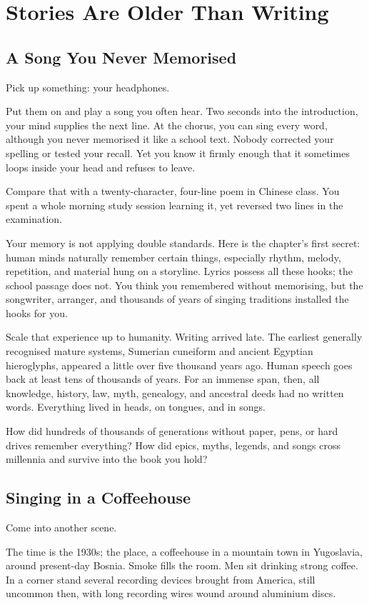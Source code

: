 \chapter{Stories Are Older Than Writing}
\section{A Song You Never Memorised}
Pick up something: your headphones.

Put them on and play a song you often hear. Two seconds into the introduction, your mind supplies the next line. At the chorus, you can sing every word, although you never memorised it like a school text. Nobody corrected your spelling or tested your recall. Yet you know it firmly enough that it sometimes loops inside your head and refuses to leave.

Compare that with a twenty-character, four-line poem in Chinese class. You spent a whole morning study session learning it, yet reversed two lines in the examination.

Your memory is not applying double standards. Here is the chapter's first secret: human minds naturally remember certain things, especially rhythm, melody, repetition, and material hung on a storyline. Lyrics possess all these hooks; the school passage does not. You think you remembered without memorising, but the songwriter, arranger, and thousands of years of singing traditions installed the hooks for you.

Scale that experience up to humanity. Writing arrived late. The earliest generally recognised mature systems, Sumerian cuneiform and ancient Egyptian hieroglyphs, appeared a little over five thousand years ago. Human speech goes back at least tens of thousands of years. For an immense span, then, all knowledge, history, law, myth, genealogy, and ancestral deeds had no written words. Everything lived in heads, on tongues, and in songs.

How did hundreds of thousands of generations without paper, pens, or hard drives remember everything? How did epics, myths, legends, and songs cross millennia and survive into the book you hold?

\section{Singing in a Coffeehouse}
Come into another scene.

The time is the 1930s; the place, a coffeehouse in a mountain town in Yugoslavia, around present-day Bosnia. Smoke fills the room. Men sit drinking strong coffee. In a corner stand several recording devices brought from America, still uncommon then, with long recording wires wound around aluminium discs.

